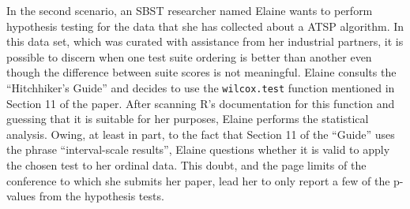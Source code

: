 In the second scenario, an SBST researcher named Elaine wants to perform hypothesis testing for the data that she has
collected about a ATSP algorithm.  In this data set, which was curated with assistance from her industrial partners, it
is possible to discern when one test suite ordering is better than another even though the difference between suite
scores is not meaningful. Elaine consults the ``Hitchhiker's Guide'' and decides to use the {\tt wilcox.test} function
mentioned in Section 11 of the paper. After scanning R's documentation for this function and guessing that it is
suitable for her purposes, Elaine performs the statistical analysis. Owing, at least in part, to the fact that Section
11 of the ``Guide'' uses the phrase ``interval-scale results'', Elaine questions whether it is valid to apply the chosen
test to her ordinal data. This doubt, and the page limits of the conference to which she submits her paper, lead her to
only report a few of the p-values from the hypothesis tests.


